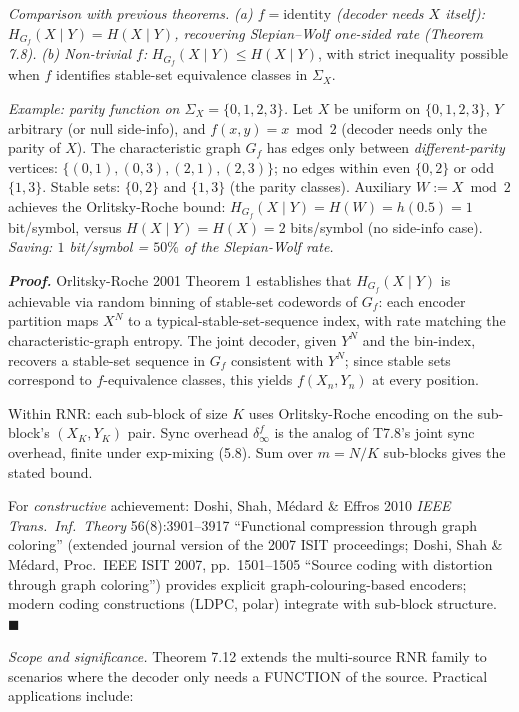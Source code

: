\documentclass[
]{article}
\begin{document}
\emph{Comparison with previous theorems.}
\emph{(a) $f = \mathrm{identity}$ (decoder needs $X$ itself):
$H_{G_f}(X \mid Y) = H(X \mid Y)$, recovering Slepian--Wolf
one-sided rate (Theorem 7.8).}
\emph{(b) Non-trivial $f$:} $H_{G_f}(X \mid Y) \leq H(X \mid Y)$,
with strict inequality possible when $f$ identifies stable-set
equivalence classes in $\Sigma_X$.

\emph{Example: parity function on $\Sigma_X = \{0, 1, 2, 3\}$.}
Let $X$ be uniform on $\{0,1,2,3\}$, $Y$ arbitrary (or null
side-info), and $f(x, y) = x \bmod 2$ (decoder needs only the parity
of $X$). The characteristic graph $G_f$ has edges only between
\emph{different-parity} vertices: $\{(0,1), (0,3), (2,1), (2,3)\}$;
no edges within even $\{0, 2\}$ or odd $\{1, 3\}$. Stable sets:
$\{0, 2\}$ and $\{1, 3\}$ (the parity classes). Auxiliary $W :=
X \bmod 2$ achieves the Orlitsky-Roche bound:
$H_{G_f}(X \mid Y) = H(W) = h(0.5) = 1$ bit/symbol, versus
$H(X \mid Y) = H(X) = 2$ bits/symbol (no side-info case). \emph{Saving:
$1$ bit/symbol = $50\%$ of the Slepian-Wolf rate.}

\emph{\textbf{Proof.}} Orlitsky-Roche 2001 Theorem 1 establishes that
$H_{G_f}(X \mid Y)$ is achievable via random binning of stable-set
codewords of $G_f$: each encoder partition maps $X^N$ to a
typical-stable-set-sequence index, with rate matching the
characteristic-graph entropy. The joint decoder, given $Y^N$ and the
bin-index, recovers a stable-set sequence in $G_f$ consistent with
$Y^N$; since stable sets correspond to $f$-equivalence classes, this
yields $f(X_n, Y_n)$ at every position.

Within RNR: each sub-block of size $K$ uses Orlitsky-Roche encoding
on the sub-block's $(X_K, Y_K)$ pair. Sync overhead
$\delta_\infty^f$ is the analog of T7.8's joint sync overhead,
finite under exp-mixing (5.8). Sum over $m = N/K$ sub-blocks gives
the stated bound.

For \emph{constructive} achievement: Doshi, Shah, M{\'e}dard \&
Effros 2010 \emph{IEEE Trans.\ Inf.\ Theory} 56(8):3901--3917
``Functional compression through graph coloring'' (extended journal
version of the 2007 ISIT proceedings; Doshi, Shah \& M{\'e}dard, Proc.\
IEEE ISIT 2007, pp.\ 1501--1505 ``Source coding with distortion
through graph coloring'') provides explicit graph-colouring-based
encoders; modern coding constructions (LDPC, polar) integrate with
sub-block structure.
\hfill$\blacksquare$

\emph{Scope and significance.} Theorem 7.12 extends the multi-source
RNR family to scenarios where the decoder only needs a FUNCTION of
the source. Practical applications include:
\end{document}
